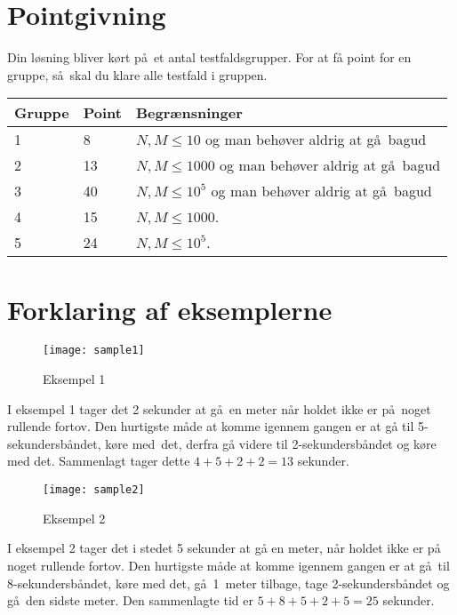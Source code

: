\section*{Pointgivning}
Din løsning bliver kørt på et antal testfaldsgrupper.
For at få point for en gruppe, så skal du klare alle testfald i gruppen.

\noindent
\begin{tabular}{| l | l | l |}
\hline
Gruppe & Point & Begrænsninger \\ \hline
1     & 8          &  $N,M \le 10$ og man behøver aldrig at gå bagud\\ \hline
2     & 13         &  $N,M \le 1000$ og man behøver aldrig at gå bagud\\ \hline
3     & 40         &  $N,M \le 10^5$ og man behøver aldrig at gå bagud\\ \hline
4     & 15         &  $N,M \le 1000$. \\ \hline
5     & 24         &  $N,M \le 10^5$. \\ \hline
\end{tabular}

\section*{Forklaring af eksemplerne}

\begin{figure}[h]
	\centering
\texttt{[image: sample1]}
\caption{Eksempel 1}
\end{figure}
I eksempel 1 tager det 2 sekunder at gå en meter når holdet ikke er på noget rullende fortov.
Den hurtigste måde at komme igennem gangen er at gå til 5-sekundersbåndet, køre med det, derfra gå videre til 2-sekundersbåndet og køre med det.
Sammenlagt tager dette $4+5+2+2=13$ sekunder.



\begin{figure}[h]
	\centering
\texttt{[image: sample2]}
\caption{Eksempel 2}
\end{figure}
I eksempel 2 tager det i stedet 5 sekunder at gå en meter, når holdet ikke er på noget rullende fortov.
Den hurtigste måde at komme igennem gangen er at gå til 8-sekundersbåndet, køre med det, gå 1~meter tilbage, tage 2-sekundersbåndet og gå den sidste meter.
Den sammenlagte tid er $5+8+5+2+5=25$ sekunder.

